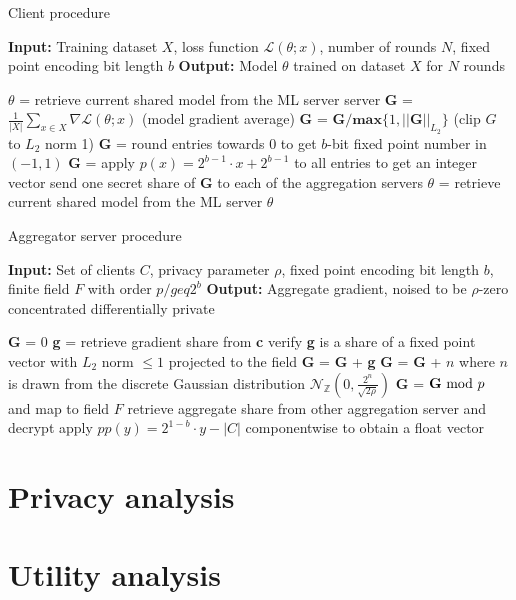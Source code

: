 \documentclass{article}
\begin{document}
\begin{algorithm}
  \caption{Client procedure}\label{client}

  \begin{algorithmic}[1]
  \State\textbf{Input:} Training dataset $X$, loss function $\mathcal L(\theta; x)$, number of rounds $N$, fixed point encoding bit length $b$
  \State\textbf{Output:} Model $\theta$ trained on dataset $X$ for $N$ rounds

  \State$\theta$ = retrieve current shared model from the ML server server
  \State\textbf{G} = $\frac{1}{|X|} \sum_{x\in X} \nabla\mathcal L(\theta; x)$ (model gradient average)
  \State\textbf{G} = $\textbf{G}/\mathbf{max}\{1,||\textbf{G}||_{L_2}\}$ (clip $G$ to $L_2$ norm 1)
  \State\textbf{G} = round entries towards $0$ to get $b$-bit fixed point number in $(-1, 1)$
  \State\textbf{G} = apply $p(x) = 2^{b-1}\cdot x + 2^{b-1}$ to all entries to get an integer vector
  \State send one secret share of \textbf{G} to each of the aggregation servers
  \EndFor
  \State$\theta$ = retrieve current shared model from the ML server
  \State\Return $\theta$
  \end{algorithmic}
\end{algorithm}


\begin{algorithm}
  \caption{Aggregator server procedure}\label{server}
  \begin{algorithmic}[1]
  \State \textbf{Input:} Set of clients $C$, privacy parameter $\rho$, fixed point encoding bit length $b$, finite field $F$ with order $p /geq 2^b$
  \State \textbf{Output:} Aggregate gradient, noised to be $\rho$-zero concentrated differentially private

  \State \textbf{G} = 0
       \State \textbf{g} = retrieve gradient share from \textbf{c}
	   \State verify \textbf{g} is a share of a fixed point vector with $L_2$ norm $\leq 1$ projected to the field
	   \State \textbf{G} = \textbf{G} + \textbf{g}
  \EndFor
  \State \textbf{G} = \textbf{G} + $n$ where $n$ is drawn from the discrete Gaussian distribution $\mathcal N_\mathbb{Z}(0,\frac{2^n}{\sqrt{2\rho}})$
  \State \textbf{G} = $\textbf{G}\textnormal{ mod } p$ and map to field $F$
  \State retrieve aggregate share from other aggregation server and decrypt
  \State apply $pp(y) = 2^{1-b} \cdot y - |C|$ componentwise to obtain a float vector
  \end{algorithmic}
\end{algorithm}
\section{Privacy analysis}


\section{Utility analysis}



\end{document}
